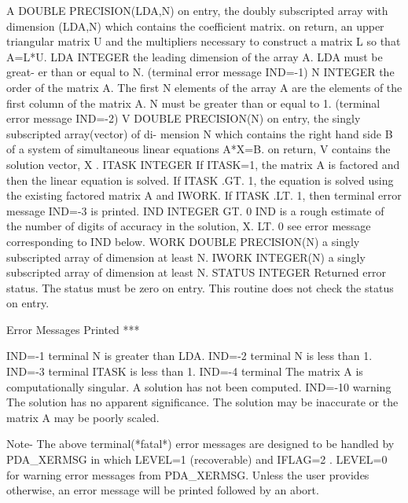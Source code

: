 \documentclass[11pt,twoside,nolof]{starlink}
\begin{document}
\begin{terminalv}
    A      DOUBLE PRECISION(LDA,N)
             on entry, the doubly subscripted array with dimension
               (LDA,N) which contains the coefficient matrix.
             on return, an upper triangular matrix U and the
               multipliers necessary to construct a matrix L
               so that A=L*U.
    LDA    INTEGER
             the leading dimension of the array A.  LDA must be great-
             er than or equal to N.  (terminal error message IND=-1)
    N      INTEGER
             the order of the matrix A.  The first N elements of
             the array A are the elements of the first column of
             the matrix A.  N must be greater than or equal to 1.
             (terminal error message IND=-2)
    V      DOUBLE PRECISION(N)
             on entry, the singly subscripted array(vector) of di-
               mension N which contains the right hand side B of a
               system of simultaneous linear equations A*X=B.
             on return, V contains the solution vector, X .
    ITASK  INTEGER
             If ITASK=1, the matrix A is factored and then the
               linear equation is solved.
             If ITASK .GT. 1, the equation is solved using the existing
               factored matrix A and IWORK.
             If ITASK .LT. 1, then terminal error message IND=-3 is
               printed.
    IND    INTEGER
             GT. 0  IND is a rough estimate of the number of digits
                     of accuracy in the solution, X.
             LT. 0  see error message corresponding to IND below.
    WORK   DOUBLE PRECISION(N)
             a singly subscripted array of dimension at least N.
    IWORK  INTEGER(N)
             a singly subscripted array of dimension at least N.
    STATUS INTEGER
             Returned error status.
             The status must be zero on entry. This
             routine does not check the status on entry.

  Error Messages Printed ***

    IND=-1  terminal   N is greater than LDA.
    IND=-2  terminal   N is less than 1.
    IND=-3  terminal   ITASK is less than 1.
    IND=-4  terminal   The matrix A is computationally singular.
                         A solution has not been computed.
    IND=-10 warning    The solution has no apparent significance.
                         The solution may be inaccurate or the matrix
                         A may be poorly scaled.

               Note-  The above terminal(*fatal*) error messages are
                      designed to be handled by PDA_XERMSG in which
                      LEVEL=1 (recoverable) and IFLAG=2 .  LEVEL=0
                      for warning error messages from PDA_XERMSG.  Unless
                      the user provides otherwise, an error message
                      will be printed followed by an abort.


\end{terminalv}
\end{document}
